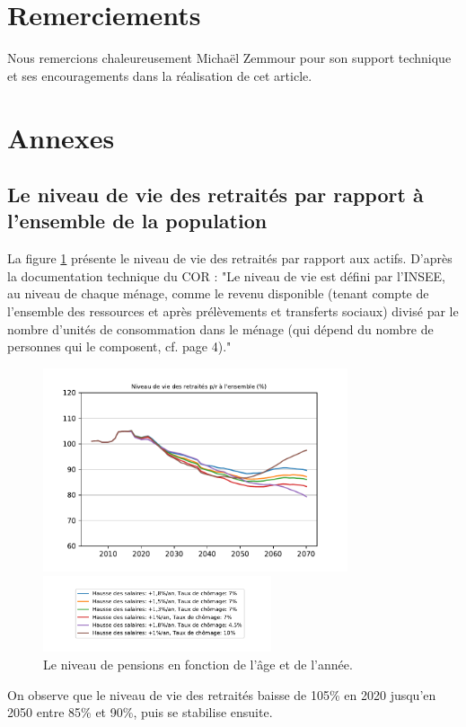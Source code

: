\documentclass[10pt]{article}
\begin{document}

\section{Remerciements}

Nous remercions chaleureusement Michaël Zemmour pour son support 
technique et ses encouragements dans la réalisation de cet article. 


\section{Annexes}

\subsection{Le niveau de vie des retraités par rapport à l'ensemble de la population}

La figure \ref{fig-simulation-RNV-vs-pensions} présente 
le niveau de vie des retraités par rapport aux actifs. 
D'après la documentation technique du COR : "Le niveau de vie est défini 
par l’INSEE, au niveau de chaque ménage, comme le revenu disponible (tenant
compte de l’ensemble des ressources et après prélèvements et transferts sociaux) 
divisé par le nombre d’unités de consommation dans le ménage 
(qui dépend du nombre de personnes qui le composent, cf. page 4)."

\begin{figure}
\begin{center}
\includegraphics[width=0.8\textwidth]{Simulation-RNV.pdf}

\includegraphics[width=0.6\textwidth]{Simulation-legende.pdf}
\end{center}

\caption{Le niveau de pensions en fonction de l'âge et de l'année.}
\label{fig-simulation-RNV-vs-pensions}
\end{figure}

On observe que le niveau de vie des retraités 
baisse de 105\% en 2020 jusqu'en 2050 entre 85\% et 90\%, puis se stabilise ensuite. 
\end{document}
